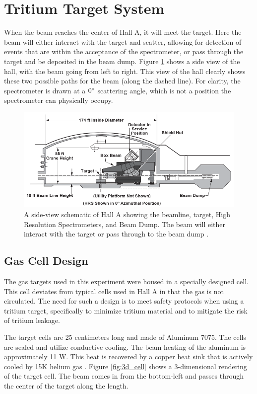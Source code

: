 \section{Tritium Target System}

When the beam reaches the center of Hall A, it will meet the target. Here the beam will either interact with the target and scatter, allowing for detection of events that are within the acceptance of the spectrometer, or pass through the target and be deposited in the beam dump. Figure \ref{fig:ha_side} shows a side view of the hall, with the beam going from left to right. This view of the hall clearly shows these two possible paths for the beam (along the dashed line). For clarity, the spectrometer is drawn at a $0\degree$ scattering angle, which is not a position the spectrometer can physically occupy.

\begin{figure}
\begin{center}
	\includegraphics[width=.8\textwidth]{./setup/fig/HallA_side.png}
	\caption{A side-view schematic of Hall A showing the beamline, target, High Resolution Spectrometers, and Beam Dump. The beam will either interact with the target or pass through to the beam dump \cite{HANIM}.}
	\label{fig:ha_side}
\end{center}
\end{figure}

\subsection{Gas Cell Design}
\label{sec:gas_cell}
The gas targets used in this experiment were housed in a specially designed cell. This cell deviates from typical cells used in Hall A in that the gas is not circulated. The need for such a design is to meet safety protocols when using a tritium target, specifically to minimize tritium material and to mitigate the risk of tritium leakage.

The target cells are 25 centimeters long and made of Aluminum 7075. The cells are sealed and utilize conductive cooling. The beam heating of the aluminum is approximately 11 W. This heat is recovered by a copper heat sink that is actively cooled by 15K helium gas \cite{cell_design}. Figure \ref{fig:3d_cell} shows a 3-dimensional rendering of the target cell. The beam comes in from the bottom-left and passes through the center of the target along the length.

